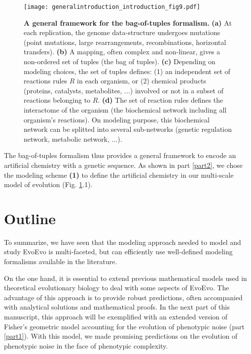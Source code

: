 \begin{figure}[!ht]
\centering
\texttt{[image: generalintroduction\_introduction\_fig9.pdf]}
\caption[A general framework for the bag-of-tuples formalism.]{{\bf A general framework for the bag-of-tuples formalism.}
\textbf{(a)} At each replication, the genome data-structure undergoes mutations (point mutations, large rearrangements, recombinations, horizontal transfers). \textbf{(b)} A mapping, often complex and non-linear, gives a non-ordered set of tuples (the bag of tuples). \textbf{(c)} Depending on modeling choices, the set of tuples defines: (1) an independent set of reactions rules $R$ in each organism, or (2) chemical products (proteins, catalysts, metabolites, ...) involved or not in a subset of reactions belonging to $R$. \textbf{(d)} The set of reaction rules defines the interactome of the organism (the biochemical network including all organism's reactions). On modeling purpose, this biochemical network can be splitted into several sub-networks (genetic regulation network, metabolic network, ...).}
\label{fig:generalintroduction:introduction:fig9}
\end{figure}

The bag-of-tuples formalism thus provides a general framework to encode an artificial chemistry with a genetic sequence. As shown in part \ref{part2}, we chose the modeling scheme \textbf{(1)} to define the artificial chemistry in our multi-scale model of evolution (Fig. \ref{fig:generalintroduction:introduction:fig9}.1).

\section{Outline}
\label{sec:general_introduction:introduction:outline}

To summarize, we have seen that the modeling approach needed to model and study EvoEvo is multi-faceted, but can efficiently use well-defined modeling formalisms available in the literature.

On the one hand, it is essential to extend previous mathematical models used in theoretical evolutionary biology to deal with some aspects of EvoEvo. The advantage of this approach is to provide robust predictions, often accompanied with analytical solutions and mathematical proofs. In the next part of this manuscript, this approach will be exemplified with an extended version of Fisher's geometric model accounting for the evolution of phenotypic noise (part \ref{part1}). With this model, we made promising predictions on the evolution of phenotypic noise in the face of phenotypic complexity.

